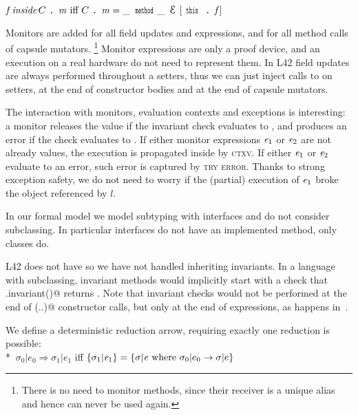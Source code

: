 $%
\f\, \textit{inside}\, C\singleDot\m\text{ iff }
C\singleDot\m=\_\,\Kw{method}\_\,\ctx[\Kw{this}\singleDot\f]
$


\noindent Monitors are added for all field updates and \Q@new@ expressions, and for all
method calls of capsule mutators.%
\footnote{%
There is no need to monitor \Q@capsule@ methods, since their receiver is a unique alias and hence can never be used again.
}
Monitor expressions are only a proof device, and an execution on a real hardware do not need to represent them. 
In L42 field updates are always performed throughout a setters,
thus we can just inject
calls to \Q@invariant@ on setters, at the end of constructor bodies and at the end of  capsule mutators.

The interaction with monitors, evaluation contexts and exceptions is interesting:
a monitor releases the value if the invariant check evaluates to \Q@true@, and produces an error if the 
check evaluates to \Q@false@.
If either monitor expressions ${\mathit{e}}_1$ or ${\mathit{e}}_2$ are not already values, the execution is propagated inside
by \textsc{ctxv}.
If either ${\mathit{e}}_1$ or ${\mathit{e}}_2$ evaluate to an error, such error is captured by 
\textsc{try error}.
Thanks to strong exception safety,
we do not need to worry
if the (partial) execution of ${\mathit{e}}_1$ broke the object referenced by $l$.




\noindent In our formal model we model subtyping with interfaces 
and do not consider subclassing.
In particular interfaces do not have an implemented \Q@invariant@ method, only classes do.

L42 does not have \Q@extends@ so we have not handled inheriting invariants.
In a language with subclassing, invariant methods would implicitly start with a check that \Q@super.invariant()@ returns \Q@true@.
Note that invariant checks would not be performed at the end of \Q@super(..)@ constructor calls, but only at the end of \Q@new@ expressions, as happens in~\cite{feldman2006jose}.


 We define
a deterministic reduction arrow, requiring exactly one reduction is possible:\\*
\indent$\ \sigma_0|e_0\Rightarrow \sigma_1|e_1$ iff $\{\sigma_1|{\mathit{e}}_1\}=\{\sigma|{\mathit{e}} \text{ where } \sigma_0|e_0\rightarrow \sigma|e\}$

